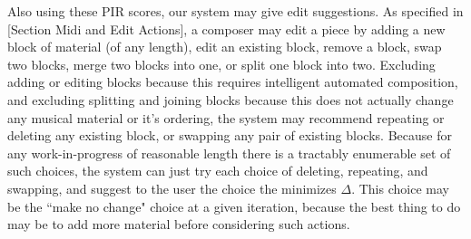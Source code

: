 \documentclass[final,authoryear,5p,times,twocolumn]{elsarticle}
\begin{document}
Also using these PIR scores, our system may give edit suggestions. As specified in [Section Midi and Edit Actions], a composer may edit a piece by adding a new block of material (of any length), edit an existing block, remove a block, swap two blocks, merge two blocks into one, or split one block into two. Excluding adding or editing blocks because this requires intelligent automated composition, and excluding splitting and joining blocks because this does not actually change any musical material or it's ordering, the system may recommend repeating or deleting any existing block, or swapping any pair of existing blocks. Because for any work-in-progress of reasonable length there is a tractably enumerable set of such choices, the system can just try each choice of deleting, repeating, and swapping, and suggest to the user the choice the minimizes $\Delta$. This choice may be the ``make no change" choice at a given iteration, because the best thing to do may be to add more material before considering such actions.





\end{document}

